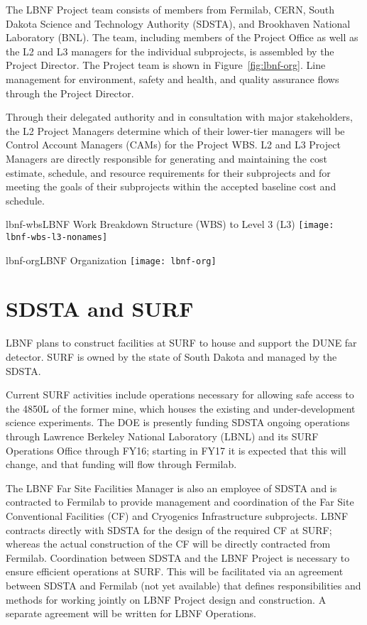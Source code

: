 The LBNF Project team consists of members from Fermilab, CERN, South Dakota Science and Technology Authority (SDSTA), and Brookhaven National Laboratory (BNL).  The team, including members of the Project Office as well as the L2 and L3 managers for the individual subprojects, is assembled by the Project Director. The Project team is shown in Figure~\ref{fig:lbnf-org}. 
Line management for environment, safety and health, and quality assurance flows through the Project Director. 

Through their delegated authority and in consultation with major stakeholders, the L2 Project Managers determine which of their lower-tier managers will be Control Account Managers (CAMs) for the Project WBS. L2 and L3 Project Managers are directly responsible for generating and maintaining the cost estimate, schedule, and resource requirements for their subprojects and for meeting the goals of their subprojects within the accepted baseline cost and schedule. 

\begin{cdrfigure}{lbnf-wbs}{LBNF Work Breakdown Structure (WBS) to Level 3 (L3)}
\texttt{[image: lbnf-wbs-l3-nonames]}
\end{cdrfigure}


\begin{cdrfigure}{lbnf-org}{LBNF Organization}
\texttt{[image: lbnf-org]}
\end{cdrfigure}

\section{SDSTA and SURF}

LBNF plans to construct facilities at SURF to house and support the DUNE far detector. SURF is owned by the state of South Dakota and managed by the SDSTA. 

Current SURF activities include operations necessary for allowing safe access to the 4850L of the former mine, which houses the existing and under-development science experiments. The DOE is presently funding SDSTA ongoing operations through Lawrence Berkeley National Laboratory (LBNL) and its SURF Operations Office through FY16; starting in FY17 it is expected that this will change, and that funding will flow through Fermilab. 

The LBNF Far Site Facilities Manager is also an employee of SDSTA and is contracted to Fermilab to provide management and coordination of the Far Site Conventional Facilities (CF) and Cryogenics Infrastructure subprojects. LBNF contracts directly with SDSTA for the design of the required CF at SURF; whereas the actual construction of the CF will be directly contracted from Fermilab. Coordination between SDSTA and the LBNF Project is necessary to ensure efficient operations at SURF. This will be facilitated via an agreement between SDSTA and Fermilab (not yet available) that defines responsibilities and methods for working jointly on LBNF Project design and construction. A separate agreement will be written for LBNF Operations. 

